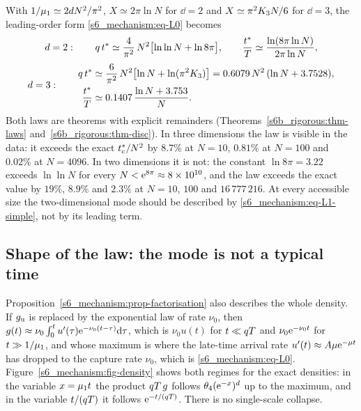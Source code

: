 With $1/\mu_{1}\simeq2d N^{2}/\pi^{2}$, $X\simeq2\pi\ln N$ for $\dd=2$ and $X\simeq\pi^{2}K_{3} N/6$ for $\dd=3$, the
leading-order form \eqref{s6_mechanism:eq-L0} becomes
\begin{equation}\label{s6_mechanism:eq-asym-2d}
  d=2:\qquad q\,t^{*}\simeq\frac{4}{\pi^{2}}\,N^{2}\bigl[\ln\ln N+\ln 8\pi\bigr],\qquad
  \frac{t^{*}}{T}\simeq\frac{\ln(8\pi\ln N)}{2\pi\ln N},
\end{equation}
\begin{equation}\label{s6_mechanism:eq-asym-3d}
  d=3:\qquad
  \begin{aligned}
  q\,t^{*}&\simeq\frac{6}{\pi^{2}}\,N^{2}\bigl[\ln N+\ln(\pi^{2}K_{3})\bigr]=0.6079\,N^{2}\,(\ln N+3.7528),\\
  \frac{t^{*}}{T}&\simeq0.1407\,\frac{\ln N+3.753}{N}.
  \end{aligned}
\end{equation}
Both laws are theorems with explicit remainders (Theorems~\ref{s6b_rigorous:thm-laws} and~\ref{s6b_rigorous:thm-disc}). In
three dimensions the law is visible in the data: it exceeds the exact $t^{*}_{\mathrm{c}}/N^{2}$ by $8.7\%$ at $N=10$, $0.81\%$ at
$N=100$ and $0.02\%$ at $N=4096$. In two dimensions it is not: the constant $\ln8\pi=3.22$ exceeds $\ln\ln N$ for every
$N<\mathrm{e}^{8\pi}\approx8\times10^{10}$, and the law exceeds the exact value by $19\%$, $8.9\%$ and $2.3\%$ at $N=10$, $100$ and
$16\,777\,216$. At every accessible size the two-dimensional mode should be described by
\eqref{s6_mechanism:eq-L1-simple}, not by its leading term.

\subsection{Shape of the law: the mode is not a typical time}\label{s6_mechanism:ssec-shape}

Proposition~\ref{s6_mechanism:prop-factorisation} also describes the whole density. If $g_{\mathrm u}$ is replaced by the
exponential law of rate $\nu_0$, then $g(t)\approx\nu_0\int_0^{t}u'(\tau)\mathrm{e}^{-\nu_0(t-\tau)}\mathrm{d}\tau$, which is $\nu_0u(t)$ for
$t\ll qT$ and $\nu_0\mathrm{e}^{-\nu_0t}$ for $t\gg1/\mu_{1}$, and whose maximum is where the late-time arrival rate
$u'(t)\approx A\mu\mathrm{e}^{-\mu t}$ has dropped to the capture rate $\nu_0$, which is \eqref{s6_mechanism:eq-L0}.
Figure~\ref{s6_mechanism:fig-density} shows both regimes for the exact densities: in the variable $x=\mu_{1} t$ the product
$qT\,g$ follows $\theta_4(\mathrm{e}^{-x})^{d}$ up to the maximum, and in the variable $t/(qT)$ it follows $\mathrm{e}^{-t/(qT)}$.
There is no single-scale collapse.

